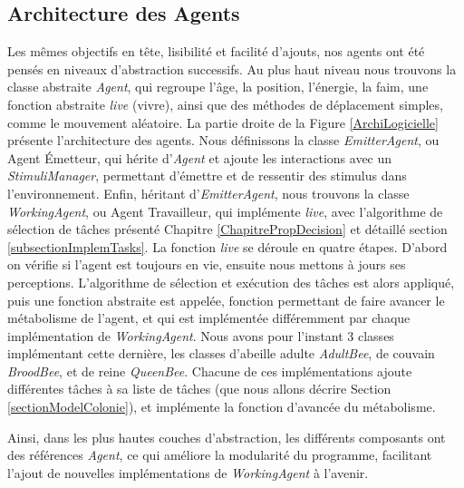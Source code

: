 			\subsection{Architecture des Agents}
			Les mêmes objectifs en tête, lisibilité et facilité d'ajouts, nos agents ont été pensés en niveaux d'abstraction successifs. Au plus haut niveau nous trouvons la classe abstraite \textit{Agent}, qui regroupe l'âge, la position, l'énergie, la faim, une fonction abstraite \textit{live} (vivre), ainsi que des méthodes de déplacement simples, comme le mouvement aléatoire. La partie droite de la Figure \ref{ArchiLogicielle} présente l'architecture des agents. Nous définissons la classe \textit{EmitterAgent}, ou Agent Émetteur, qui hérite d'\textit{Agent} et ajoute les interactions avec un \textit{StimuliManager}, permettant d'émettre et de ressentir des stimulus dans l'environnement. Enfin, héritant d'\textit{EmitterAgent}, nous trouvons la classe \textit{WorkingAgent}, ou Agent Travailleur, qui implémente \textit{live}, avec l'algorithme de sélection de tâches présenté Chapitre \ref{ChapitrePropDecision} et détaillé section \ref{subsectionImplemTasks}. La fonction \textit{live} se déroule en quatre étapes. D'abord on vérifie si l'agent est toujours en vie, ensuite nous mettons à jours ses perceptions. L'algorithme de sélection et exécution des tâches est alors appliqué, puis une fonction abstraite est appelée, fonction permettant de faire avancer le métabolisme de l'agent, et qui est implémentée différemment par chaque implémentation de \textit{WorkingAgent}. Nous avons pour l'instant 3 classes implémentant cette dernière, les classes d'abeille adulte \textit{AdultBee}, de couvain \textit{BroodBee}, et de reine \textit{QueenBee}. Chacune de ces implémentations ajoute différentes tâches à sa liste de tâches (que nous allons décrire Section \ref{sectionModelColonie}), et implémente la fonction d'avancée du métabolisme.
			
			Ainsi, dans les plus hautes couches d'abstraction, les différents composants ont des références \textit{Agent}, ce qui améliore la modularité du programme, facilitant l'ajout de nouvelles implémentations de \textit{WorkingAgent} à l'avenir. 
			
